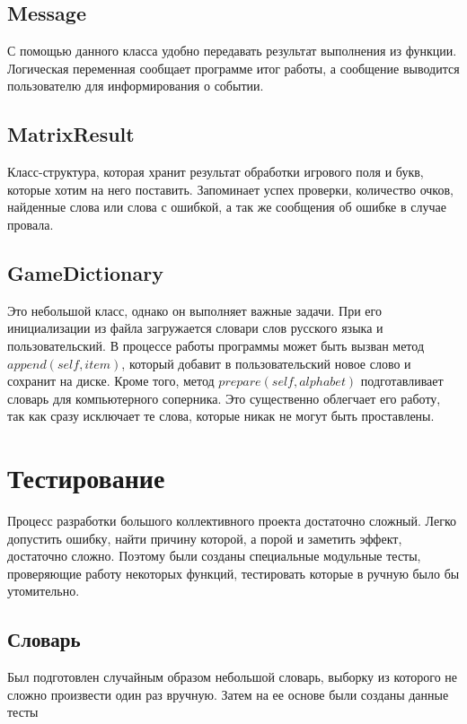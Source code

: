 \documentclass[a4paper,14pt]{article}
\begin{document}
	\subsection{Message}
	С помощью данного класса удобно передавать результат выполнения из функции. Логическая переменная сообщает программе итог работы, а сообщение выводится пользователю для информирования о событии.
	
	\subsection{MatrixResult}
	Класс-структура, которая хранит результат обработки игрового поля и букв, которые хотим на него поставить. Запоминает успех проверки, количество очков, найденные слова или слова с ошибкой, а так же сообщения об ошибке в случае провала.
	
	\subsection{GameDictionary}
	Это небольшой класс, однако он выполняет важные задачи. При его инициализации из файла загружается словари слов русского языка и пользовательский. В процессе работы программы может быть вызван метод $append(self, item)$, который добавит в пользовательский новое слово и сохранит на диске. Кроме того, метод $prepare(self, alphabet)$ подготавливает словарь для компьютерного соперника. Это существенно облегчает его работу, так как сразу исключает те слова, которые никак не могут быть проставлены.
	
\section{Тестирование}
	Процесс разработки большого коллективного проекта достаточно сложный. Легко допустить ошибку, найти причину которой, а порой и заметить эффект, достаточно сложно. Поэтому были созданы специальные модульные тесты, проверяющие работу некоторых функций, тестировать которые в ручную было бы утомительно.
	
	\subsection{Словарь}
	Был подготовлен случайным образом небольшой словарь, выборку из которого не сложно произвести один раз вручную. Затем на ее основе были созданы данные тесты
	
\end{document}
